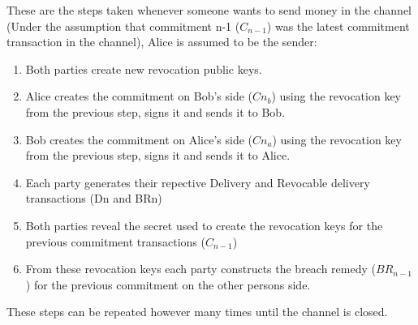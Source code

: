 These are the steps taken whenever someone wants to send money in the channel (Under the assumption that commitment n-1 ($C_{n-1}$) was the latest commitment transaction in the channel), Alice is assumed to be the sender: 
\begin{enumerate}
	\item Both parties create new revocation public keys.
	\item Alice creates the commitment on Bob's side ($Cn_{b}$) using the revocation key from the previous step, signs it and sends it to Bob.
	\item Bob creates the commitment on Alice's side ($Cn_{a}$) using the revocation key from the previous step, signs it and sends it to Alice.
	\item Each party generates their repective Delivery and Revocable delivery transactions (Dn and BRn)
	\item Both parties reveal the secret used to create the revocation keys for the previous commitment transactions ($C_{n-1}$)
	\item From these revocation keys each party constructs the breach remedy ($BR_{n-1}$) for the previous commitment on the other persons side.
\end{enumerate}

These steps can be repeated however many times until the channel is closed. 